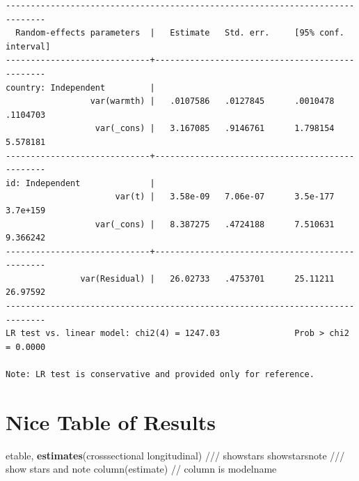 \documentclass[
  letterpaper,
  DIV=11,
  numbers=noendperiod]{scrreprt}
\newenvironment{Shaded}{\begin{snugshade}}{\end{snugshade}}
\newcommand{\CommentTok}[1]{\textcolor[rgb]{0.37,0.37,0.37}{#1}}
\newcommand{\KeywordTok}[1]{\textcolor[rgb]{0.00,0.23,0.31}{\textbf{#1}}}
\newcommand{\NormalTok}[1]{\textcolor[rgb]{0.00,0.23,0.31}{#1}}
\begin{document}
\begin{verbatim}
------------------------------------------------------------------------------
  Random-effects parameters  |   Estimate   Std. err.     [95% conf. interval]
-----------------------------+------------------------------------------------
country: Independent         |
                 var(warmth) |   .0107586   .0127845      .0010478    .1104703
                  var(_cons) |   3.167085   .9146761      1.798154    5.578181
-----------------------------+------------------------------------------------
id: Independent              |
                      var(t) |   3.58e-09   7.06e-07      3.5e-177    3.7e+159
                  var(_cons) |   8.387275   .4724188      7.510631    9.366242
-----------------------------+------------------------------------------------
               var(Residual) |   26.02733   .4753701      25.11211    26.97592
------------------------------------------------------------------------------
LR test vs. linear model: chi2(4) = 1247.03               Prob > chi2 = 0.0000

Note: LR test is conservative and provided only for reference.
\end{verbatim}

\section{Nice Table of Results}\label{nice-table-of-results}

\begin{Shaded}
\begin{Highlighting}[]

\NormalTok{etable, }\KeywordTok{estimates}\NormalTok{(crosssectional longitudinal) }\CommentTok{///}
\NormalTok{showstars showstarsnote }\CommentTok{/// show stars and note}
\NormalTok{column(estimate) }\CommentTok{// column is modelname}
\end{Highlighting}
\end{Shaded}
\end{document}
